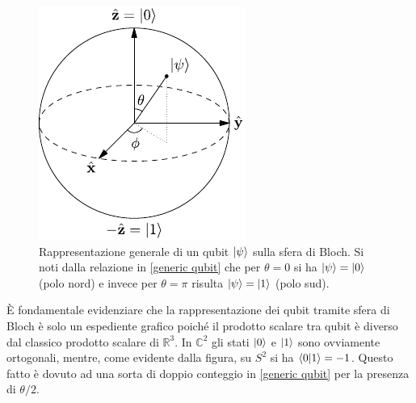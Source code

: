 \begin{figure}[!ht]
    \centering
    \includegraphics[scale=1.4]{images/Bloch_Sphere.pdf}
    \caption{Rappresentazione generale di un qubit $\ket{\psi}$ sulla sfera di Bloch. Si noti dalla relazione in \eqref{generic qubit} che per $\theta = 0$ si ha $\ket{\psi} = \ket{0} $ (polo nord) e invece per $\theta = \pi$ risulta $\ket{\psi} = \ket{1}$ (polo sud).}
    \label{fig:BlochSphere}
\end{figure}

\noindent È fondamentale evidenziare che la rappresentazione dei qubit tramite sfera di Bloch è solo un espediente grafico poiché il prodotto scalare tra qubit è diverso dal classico prodotto scalare di $\mathbb{R}^3$. In $\mathbb{C}^2$ gli stati $\ket{0}$ e $\ket{1}$ sono ovviamente ortogonali, mentre, come evidente dalla figura, su $S^2$ si ha $\braket{0}{1} = -1$. Questo fatto è dovuto ad una sorta di doppio conteggio in \eqref{generic qubit} per la presenza di $\theta/2$.